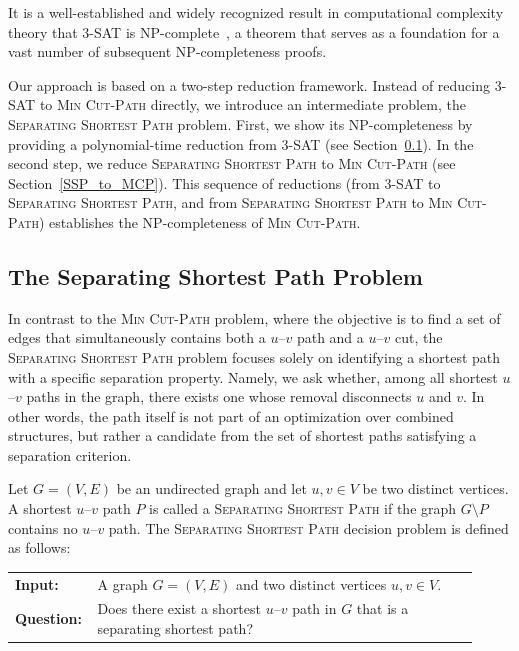 \documentclass[journal ]{new-aiaa}
\numberwithin{equation}{section}
\theoremstyle{definition}
\theoremstyle{plain}
\theoremstyle{remark}
\begin{document}
It is a well-established and widely recognized result in computational complexity theory that \textsc{3-SAT} is NP-complete~\cite{cook1971complexity}, a theorem that serves as a 
foundation for a vast number of subsequent NP-completeness proofs.

Our approach is based on a two-step reduction framework. Instead of reducing \textsc{3-SAT} to \textsc{Min Cut-Path} directly, we introduce an intermediate problem, the \textsc{Separating Shortest Path} problem. First, we show its NP-completeness 
by providing a polynomial-time reduction from \textsc{3-SAT} 
(see Section~\ref{Separating_Shortest_Path}). 
In the second step, we reduce \textsc{Separating Shortest Path} to \textsc{Min Cut-Path} 
(see Section~\ref{SSP_to_MCP}). 
This sequence of reductions (from \textsc{3-SAT} to \textsc{Separating Shortest Path}, and from \textsc{Separating Shortest Path} to \textsc{Min Cut-Path}) establishes the NP-completeness of \textsc{Min Cut-Path}.


\subsection{The Separating Shortest Path Problem}\label{Separating_Shortest_Path}
In contrast to the \textsc{Min Cut-Path} problem, where the objective is to find a set of edges that simultaneously contains both a $u$--$v$ path and a $u$--$v$ cut, the \textsc{Separating Shortest Path} problem focuses solely on identifying a shortest path with a specific separation property.  
Namely, we ask whether, among all shortest $u$--$v$ paths in the graph, there exists one whose removal disconnects $u$ and $v$.  
In other words, the path itself is not part of an optimization over combined structures, but rather a candidate from the set of shortest paths satisfying a separation criterion.

\begin{problem}
Let $G = (V,E)$ be an undirected graph and let $u,v \in V$ be two distinct vertices.  
A shortest $u$--$v$ path $P$ is called a \textsc{Separating Shortest Path} if the graph $G \setminus P$ contains no $u$--$v$ path.  
The \textsc{Separating Shortest Path} decision problem is defined as follows:

\begin{center}
\begin{tabular}{p{0.12\linewidth}p{0.8\linewidth}}
\textbf{Input:} & A graph $G = (V,E)$ and two distinct vertices $u,v \in V$.\\
\textbf{Question:} & Does there exist a shortest $u$--$v$ path in $G$ that is a separating shortest path?
\end{tabular}
\end{center}
\end{problem}
\end{document}
